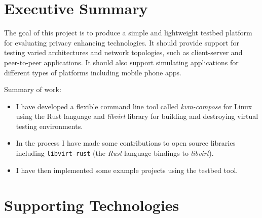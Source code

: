 \documentclass[
    author={Jacob Daniel Halsey},
    supervisor={Prof. Awais Rashid},
    degree={BSc},
    title={Building a Testbed for Evaluating Privacy Enhancing Technologies  (PETs)},
    subtitle={},
    type={software development},
    year={2021}
]{dissertation}
\begin{document}
\maketitle
\frontmatter
\makedecl
\tableofcontents

\chapter*{Executive Summary}

The goal of this project is to produce a simple and lightweight testbed platform for evaluating privacy enhancing
technologies.
It should provide support for testing varied architectures and network topologies, such as client-server and
peer-to-peer applications.
It should also support simulating applications for different types of platforms including mobile phone apps.

\vspace{1cm}

Summary of work:

\begin{itemize}
\item I have developed a flexible command line tool called \emph{kvm-compose} for Linux using the Rust
      language and \emph{libvirt} library for building and destroying virtual testing environments.
\item In the process I have made some contributions to open source libraries including \texttt{libvirt-rust}
(the \emph{Rust} language bindings to \emph{libvirt}).
\item I have then implemented some example projects using the testbed tool.
\end{itemize}

\chapter*{Supporting Technologies}
\label{chap:supporting_tech}
\end{document}

